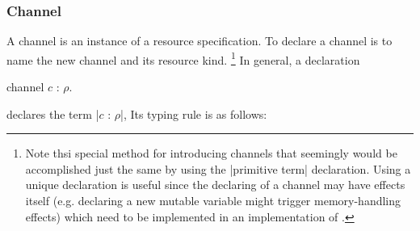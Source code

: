 %
%
%

\subsubsection{Channel}

A channel is an instance of a resource specification.
To declare a channel is to name the new channel and its resource kind.%
\footnote{
  Note thsi special method for introducing channels that seemingly would be accomplished just the same by using the \code|primitive term| declaration.
  Using a unique declaration is useful since the declaring of a channel may have effects itself (e.g. declaring a new mutable variable might trigger memory-handling effects) which need to be implemented in an implementation of \LangD.
}
In general, a declaration
\begin{snippet}
channel $c$ : $ρ$.
\end{snippet}
declares the term \code|$c$ : $ρ$|,
Its typing rule is as follows:


